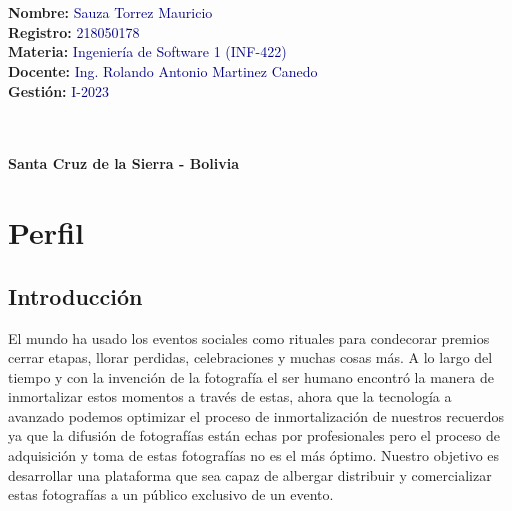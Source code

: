 \documentclass[a4paper, 12pt]{article}
\newcommand{\fecha}{\DTMDate{2023-05-11}}
\begin{document}
\begin{titlepage}
\begin{center}
			\linea\\[-1em]
			\Linea\\[4em]
			
			\begin{flushleft}
				\hspace{3em}\textbf{Nombre:} \textcolor{navy}{Sauza Torrez Mauricio}\\[0.5em]
				\hspace{3em}\textbf{Registro:} \textcolor{navy}{218050178}\\[0.5em]
				\hspace{3em}\textbf{Materia:} \textcolor{navy}{Ingeniería de Software 1 (INF-422)}\\[0.5em]
				\hspace{3em}\textbf{Docente:} \textcolor{navy}{Ing. Rolando Antonio Martinez Canedo}\\[0.5em]
				\hspace{3em}\textbf{Gestión:} \textcolor{navy}{I-2023}\\[3em]
			\end{flushleft}
			
			
			\linea\\[-0.98em]
			\Linea\\[4em]
			
			
			\vfill
			\textbf{Santa Cruz de la Sierra - Bolivia}
			
			
		\end{center}
		
		\begin{flushright}
			\fecha
		\end{flushright}
	\end{titlepage}
	
	\clearpage
	\tableofcontents
	\section{Perfil}
		\subsection{Introducción}
			El mundo ha usado los eventos sociales como rituales para condecorar premios cerrar etapas, llorar perdidas, celebraciones y muchas cosas más.
			A lo largo del tiempo y con la invención de la fotografía el ser humano encontró la manera de inmortalizar estos momentos a través de estas, ahora que la tecnología a avanzado podemos optimizar el proceso de inmortalización de nuestros recuerdos ya que la difusión de fotografías están echas por profesionales pero el proceso de adquisición y toma de estas fotografías no es el más óptimo.
			Nuestro objetivo es desarrollar una plataforma que sea capaz de albergar distribuir y comercializar estas fotografías a un público exclusivo de un evento.
			
\end{document}
